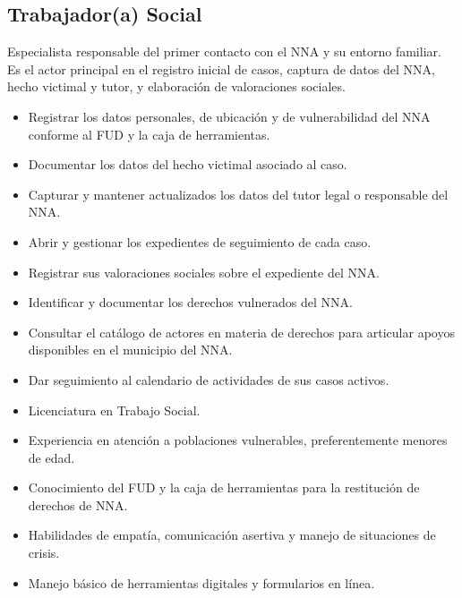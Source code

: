 \begin{Usuario}{\hypertarget{A.TrabajadorSocial}{\hypertarget{Actor.Especialista}{\subsection{Trabajador(a) Social}}}}{
		Especialista responsable del primer contacto con el NNA y su entorno 
		familiar. Es el actor principal en el registro inicial de casos, 
		captura de datos del NNA, hecho victimal y tutor, y elaboración 
		de valoraciones sociales.
	}
	\item[Responsabilidades:] \cdtEmpty
	\begin{itemize}
		\item Registrar los datos personales, de ubicación y de 
		vulnerabilidad del NNA conforme al FUD y la caja de herramientas.
		\item Documentar los datos del hecho victimal asociado al caso.
		\item Capturar y mantener actualizados los datos del tutor legal 
		o responsable del NNA.
		\item Abrir y gestionar los expedientes de seguimiento de cada caso.
		\item Registrar sus valoraciones sociales sobre el expediente del NNA.
		\item Identificar y documentar los derechos vulnerados del NNA.
		\item Consultar el catálogo de actores en materia de derechos para 
		articular apoyos disponibles en el municipio del NNA.
		\item Dar seguimiento al calendario de actividades de sus casos activos.
	\end{itemize}
	
	\item[Perfil:] \cdtEmpty
	\begin{itemize}
		\item Licenciatura en Trabajo Social.
		\item Experiencia en atención a poblaciones vulnerables, 
		preferentemente menores de edad.
		\item Conocimiento del FUD y la caja de herramientas para la 
		restitución de derechos de NNA.
		\item Habilidades de empatía, comunicación asertiva y manejo 
		de situaciones de crisis.
		\item Manejo básico de herramientas digitales y formularios en 
		línea.
	\end{itemize}
	

\end{Usuario}
